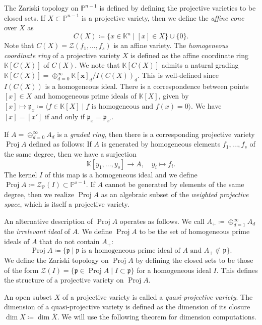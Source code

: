 \documentclass[11pt,a4paper]{article}
\newcommand{\ideal}[1]{\langle #1 \rangle}
\numberwithin{equation}{section}
\newcommand{\PP}{\mathbb{P}}
\newcommand{\KK}{\mathbb{K}}
\newcommand{\cZ}{\mathcal{Z}}
\newcommand{\xx}{\ensuremath{\boldsymbol{x}}}
\DeclareMathOperator{\Proj}{Proj}
\begin{document}
The Zariski topology on $\PP^{n-1}$ is defined by defining the projective varieties to be closed sets.
If $X\subset\PP^{n-1}$ is a projective variety, then we define the \emph{affine cone} over $X$ as \[
C(X) \coloneqq \{x\in \KK^n\mid [x]\in X\} \cup \{0\}.
\] Note that $C(X)=\cZ(f_1,\dots,f_s)$ is an affine variety.
The \emph{homogeneous coordinate ring} of a projective variety $X$ is defined as the affine coordinate ring $\KK[C(X)]$ of $C(X)$.
We note that $\KK[C(X)]$ admits a natural grading $\KK[C(X)]=\oplus_{d=0}^\infty \KK[\xx]_d/I(C(X))_d$.
This is well-defined since $I(C(X))$ is a homogeneous ideal.
There is a correspondence between points $[x]\in X$ and homogeneous prime ideals of $\KK[X]$, given by $[x]\mapsto \mathfrak{p}_{x}\coloneqq 
\ideal{f\in \KK[X]\mid f\text{ is homogeneous and } f(x)=0}$.
We have $[x]=[x']$ if and only if $\mathfrak{p}_x=\mathfrak{p}_{x'}$.

If $A=\oplus_{d=0}^{\infty} A_d$ is a \emph{graded ring}, then there is a corresponding projective variety $\Proj A$ defined as follows:
If $A$ is generated by homogeneous elements $f_1,\dots,f_s$ of the same degree, then we have a surjection \[
\KK[y_1,\dots,y_s]\rightarrow A, \quad y_i\mapsto f_i.
\] The kernel $I$ of this map is a homogeneous ideal and we define $\Proj A\coloneqq \cZ_{\PP}(I)\subset\PP^{s-1}$.
If $A$ cannot be generated by elements of the same degree, then we realize $\Proj A$ as an algebraic subset of the \emph{weighted projective space}, which is itself a projective variety.

An alternative description of $\Proj A$ operates as follows.
We call $A_{+}\coloneqq\oplus_{d=1}^\infty A_d$ the \emph{irrelevant ideal} of $A$. 
We define $\Proj A$ to be the set of homogeneous prime ideals of $A$ that do not contain $A_{+}$:\[
\Proj A\coloneqq \{ \mathfrak{p}\mid \mathfrak{p}\text{ is a homogeneous prime ideal of }A \text{ and } A_{+}\not\subset \mathfrak{p} \}.
\] We define the Zariski topology on $\Proj A$ by defining the closed sets to be those of the form $\cZ(I)=\{\mathfrak{p}\in\Proj A\mid I\subset \mathfrak{p}\}$ for a homogeneous ideal $I$.
This defines the structure of a projective variety on $\Proj A$.


An open subset $X$ of a projective variety is called a \emph{quasi-projective variety}. 
The dimension of a quasi-projective variety is defined as the dimension of its closure $\dim X\coloneqq \dim\overline{X}$.
We will use the following theorem for dimension computations.
\end{document}
